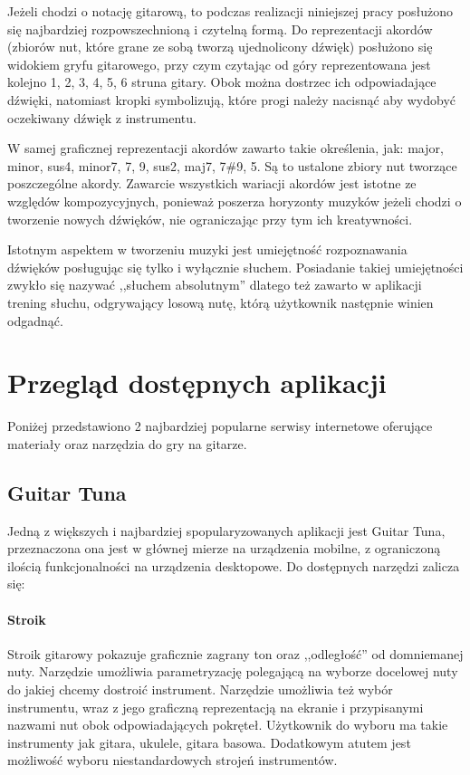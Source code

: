 Jeżeli chodzi o notację gitarową, to podczas realizacji niniejszej pracy posłużono się najbardziej rozpowszechnioną i czytelną formą. Do reprezentacji akordów (zbiorów nut, które grane ze sobą tworzą ujednolicony dźwięk) posłużono się widokiem gryfu gitarowego, przy czym czytając od góry reprezentowana jest kolejno 1, 2, 3, 4, 5, 6 struna gitary. Obok można dostrzec ich odpowiadające dźwięki, natomiast kropki symbolizują, które progi należy nacisnąć aby wydobyć oczekiwany dźwięk z instrumentu.


W samej graficznej reprezentacji akordów zawarto takie określenia, jak: major, minor, sus4, minor7, 7, 9, sus2, maj7, 7\#9, 5. Są to ustalone zbiory nut tworzące poszczególne akordy. Zawarcie wszystkich wariacji akordów jest istotne ze względów kompozycyjnych, ponieważ poszerza horyzonty muzyków jeżeli chodzi o tworzenie nowych dźwięków, nie ograniczając przy tym ich kreatywności. 

Istotnym aspektem w tworzeniu muzyki jest umiejętność rozpoznawania dźwięków posługując się tylko i wyłącznie słuchem. Posiadanie takiej umiejętności zwykło się nazywać ,,słuchem absolutnym'' dlatego też zawarto w aplikacji trening słuchu, odgrywający losową nutę, którą użytkownik następnie winien odgadnąć.  

\section{Przegląd dostępnych aplikacji}
Poniżej przedstawiono 2 najbardziej popularne serwisy internetowe oferujące materiały oraz narzędzia do gry na gitarze. 

\subsection{Guitar Tuna}

Jedną z większych i najbardziej spopularyzowanych aplikacji jest Guitar Tuna, przeznaczona ona jest w głównej mierze na urządzenia mobilne, z ograniczoną ilością funkcjonalności na urządzenia desktopowe. Do dostępnych narzędzi zalicza się:

\paragraph{Stroik}
Stroik gitarowy pokazuje graficznie zagrany ton oraz ,,odległość'' od domniemanej nuty. Narzędzie umożliwia parametryzację polegającą na wyborze docelowej nuty do jakiej chcemy dostroić instrument. Narzędzie umożliwia też wybór instrumentu, wraz z jego graficzną reprezentacją na ekranie i przypisanymi nazwami nut obok odpowiadających pokręteł. Użytkownik do wyboru ma takie instrumenty jak gitara, ukulele, gitara basowa. Dodatkowym atutem jest możliwość wyboru niestandardowych strojeń instrumentów. 

